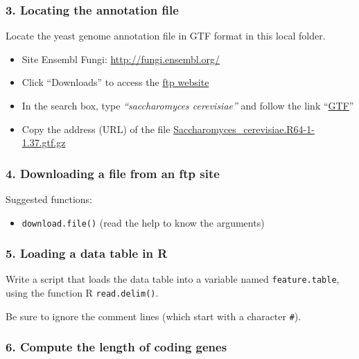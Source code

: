 \documentclass[]{article}
\providecommand{\tightlist}{%
  \setlength{\itemsep}{0pt}\setlength{\parskip}{0pt}}
\begin{document}
\subsubsection{3. Locating the annotation
file}\label{locating-the-annotation-file}

Locate the yeast genome annotation file in GTF format in this local
folder.

\begin{itemize}
\tightlist
\item
  Site Ensembl Fungi: \url{http://fungi.ensembl.org/}
\item
  Click ``Downloads'' to access the
  \href{http://fungi.ensembl.org/info/website/ftp/}{ftp website}
\item
  In the search box, type \emph{``saccharomyces cerevisiae''} and follow
  the link
  ``\href{ftp://ftp.ensemblgenomes.org/pub/release-37/fungi/gtf/saccharomyces_cerevisiae}{GTF}''
\item
  Copy the address (URL) of the file
  \href{ftp://ftp.ensemblgenomes.org/pub/release-37/fungi/gtf/saccharomyces_cerevisiae/Saccharomyces_cerevisiae.R64-1-1.37.gtf.gz}{Saccharomyces\_cerevisiae.R64-1-1.37.gtf.gz}
\end{itemize}

\subsubsection{4. Downloading a file from an ftp
site}\label{downloading-a-file-from-an-ftp-site}

Suggested functions:

\begin{itemize}
\tightlist
\item
  \texttt{download.file()} (read the help to know the arguments)
\end{itemize}

\subsubsection{5. Loading a data table in
R}\label{loading-a-data-table-in-r}

Write a script that loads the data table into a variable named
\texttt{feature.table}, using the function R \texttt{read.delim()}.

Be sure to ignore the comment lines (which start with a character
\texttt{\#}).

\subsubsection{6. Compute the length of coding
genes}\label{compute-the-length-of-coding-genes}
\end{document}
